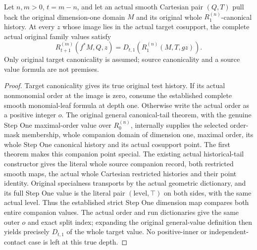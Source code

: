 \begin{theorem}
\label{hir:smooth-original-curve-full-family-values}
\leanok
{}
Let $n,m>0$, $t=m-n$, and let an actual smooth Cartesian pair $(Q,T)$
pull back the original dimension-one domain $M$ and its original whole
$R^{(n)}_1$-canonical history. At every $z$ whose image lies in the actual
target cosupport, the complete actual original family values satisfy
\[R^{(m)}_{t+1}(f^*M,Q,z)=D_{t,1}(R^{(n)}_1(M,T,gz)).\]
Only original target canonicality is assumed; source canonicality and a
source value formula are not premises.
\end{theorem}
\begin{proof}
Target canonicality gives its true original test history. If its actual
nonmonomial order at the image is zero, consume the established complete
smooth monomial-leaf formula at depth one. Otherwise write the actual
order as a positive integer $o$. The original general canonical-tail
theorem, with the genuine Step One maximal-order value over $R^{(n)}_0$,
internally supplies the selected order-mask membership, whole companion
domain of dimension one, maximal order, its whole Step One canonical
history and its actual cosupport point. The first theorem makes this
companion point special. The existing actual historical-tail constructor
gives the literal whole source companion record, both restricted smooth
maps, the actual whole Cartesian restricted histories and their point
identity. Original specialness transports by the actual geometric
dictionary, and its full Step One value is the literal pair
$(\mathrm{level},\top)$ on both sides, with the same actual level. Thus
the established strict Step One dimension map compares both entire
companion values. The actual order and run dictionaries give the same
outer $o$ and exact split index; expanding the original general-value
definition then yields precisely $D_{t,1}$ of the whole target value.
No positive-inner or independent-contact case is left at this true depth.
\end{proof}

